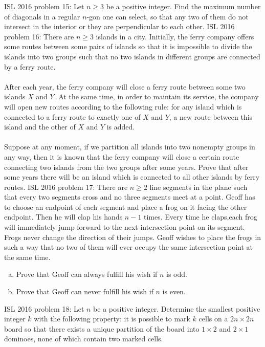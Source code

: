 ISL 2016 problem 15:  Let $n \geq 3$ be a positive integer. Find the maximum number of diagonals in a regular $n$-gon one can select, so that any two of them do not intersect in the interior or they are perpendicular to each other. 
ISL 2016 problem 16:  There are $n \geq 3$ islands in a city. Initially, the ferry company offers some routes between some pairs of islands so that it is impossible to divide the islands into two groups such that no two islands in different groups are connected by a ferry route. \\\\
After each year, the ferry company will close a ferry route between some two islands $X$ and $Y$. At the same time, in order to maintain its service, the company will open new routes according to the following rule: for any island which is connected to a ferry route to exactly one of $X$ and $Y$, a new route between this island and the other of $X$ and $Y$ is added. \\\\
Suppose at any moment, if we partition all islands into two nonempty groups in any way, then it is known that the ferry company will close a certain route connecting two islands from the two groups after some years. Prove that after some years there will be an island which is connected to all other islands by ferry routes. 
ISL 2016 problem 17:  There are $n\ge 2$ line segments in the plane such that every two segments cross and no three segments meet at a point. Geoff has to choose an endpoint of each segment and place a frog on it facing the other endpoint. Then he will clap his hands $n-1$ times. Every time he claps,each frog will immediately jump forward to the next intersection point on its segment. Frogs never change the direction of their jumps. Geoff wishes to place the frogs in such a way that no two of them will ever occupy the same intersection point at the same time.
\begin{enumerate}[(a)]
  \item Prove that Geoff can always fulfill his wish if $n$ is odd.
  \item Prove that Geoff can never fulfill his wish if $n$ is even.
\end{enumerate} 
ISL 2016 problem 18:  Let $n$ be a positive integer. Determine the smallest positive integer $k$ with the following property: it is possible to mark $k$ cells on a $2n \times 2n$ board so that there exists a unique partition of the board into $1 \times 2$ and $2 \times 1$ dominoes, none of which contain two marked cells. 
